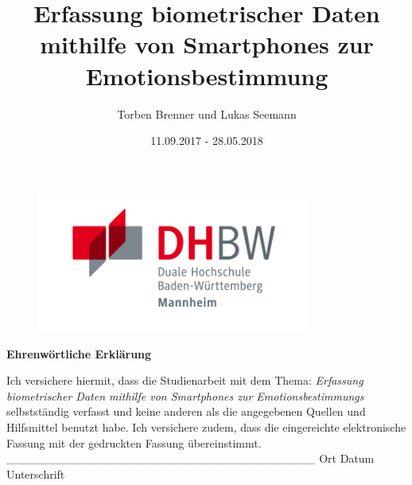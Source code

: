 \documentclass[12pt,titlepage,ngerman]{article}
\begin{document}
\begin{titlepage}
	\begin{figure}
		\centering
		\includegraphics[width=9cm]{Bilder/DHBW_MA_Logo.jpg}
	\end{figure}%
	\title{Erfassung biometrischer Daten mithilfe von Smartphones zur Emotionsbestimmung}	
	\date{11.09.2017 - 28.05.2018}
	\author{Torben Brenner und Lukas Seemann}
	\maketitle
\end{titlepage}
\newpage
{}
\begin{center}
	{\Large \bfseries Ehrenwörtliche Erklärung}
\end{center}
\vspace{1cm}
Ich versichere hiermit, dass die Studienarbeit mit dem Thema: \textit{Erfassung biometrischer Daten mithilfe von Smartphones zur Emotionsbestimmungs} selbstständig verfasst und keine anderen als die angegebenen Quellen und Hilfsmittel benutzt habe.
\newline \newline
Ich versichere zudem, dass die eingereichte elektronische Fassung mit der gedruckten Fassung übereinstimmt. \newline \newline\newline \newline \newline \newline
{\_\_\_\_\_\_\_\_\_\_\_\_\_\_\_\_\_\_\_\_\_\_\_\_\_\_\_\_\_\_\_\_\_\_\_\_\_}\space\space\space\space\space\space\space\space\space\space\space\space\space\space\space\space\space\space\space\space\space\space\space\space\space {\_\_\_\_\_\_\_\_\_\_\_\_\_\_\_\_\_\_\_\_\_\_\_\_\_\_\_\_\_\_\_\_\_\_\_\_\_\_\_\_\_\_\_\_\_\_\_\_\_\_\_} \newline
Ort \space\space\space\space\space\space\space\space\space\space\space\space\space\space Datum \space\space\space\space\space\space\space\space\space\space\space\space\space\space\space\space\space\space\space\space\space\space\space\space\space\space\space\space\space\space\space\space\space\space\space\space\space\space\space\space\space\space\space\space\space\space\space\space\space\space\space\space Unterschrift
\end{document}
